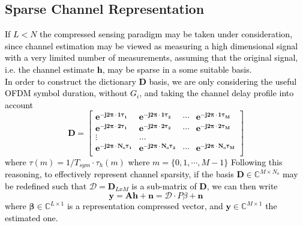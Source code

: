 \subsection{Sparse Channel Representation}
\label{SparseChannelRepresentation}
\textcolor{black}{If $L<N$ the compressed sensing paradigm may be taken under consideration, since channel estimation may be viewed as measuring a high dimensional signal with a very limited number of measurements, assuming that the original signal, i.e. the channel estimate $\mathbf{h}$, may be sparse in a some suitable basis.\\
In order to construct the dictionary $\mathbf{D}$ basis, we are only considering the useful OFDM symbol duration, without $G_i$, and taking the channel delay profile into account\\
\textcolor{black}
{
	\[
\mathbf{	D=
	\begin{bmatrix}
	e^{-j2\pi \cdot1 \tau_1} & e^{-j2\pi\cdot1 \tau_2}&\cdots& e^{-j2\pi \cdot1 \tau_M} \\
	e^{-j2\pi \cdot2 \tau_1} & e^{-j2\pi\cdot2 \tau_2}&\cdots& e^{-j2\pi \cdot2 \tau_M} \\
	\vdots & \dots & \\                                                                                     
	e^{-j2\pi\cdot N_o\tau_1} & e^{-j2\pi \cdot N_o\tau_2} &\cdots& e^{-j2\pi \cdot N_o\tau_M} \\
	\end{bmatrix}}
	\]
where 
$\tau(m)=  1/T_{sym}\cdot \tau_h(m)$  where $m=\{0,1,\cdots,M-1\}$
}
Following this reasoning, to effectively represent channel sparsity, if the basis $\mathbf{D}\in \mathbb{C}^{M\times N_o}$ may be redefined such that $\mathcal{D}=\mathbf{D}_{LxM}$ is a sub-matrix of $\mathbf{D}$, we can then write\\
\begin{equation}
\label{sparseChannel}
\mathbf{y}=\mathbf{Ah}+\mathbf{n}=\mathcal{D}\cdot P\beta+\mathbf{n}
\end{equation}
\textcolor{black}{
 where $\mathbf{\beta}\in \mathbb{C}^{L\times 1}$ is a representation compressed vector, and $\mathbf{y} \in \mathbb{C}^{M\times 1}$ the estimated one. 
}}

